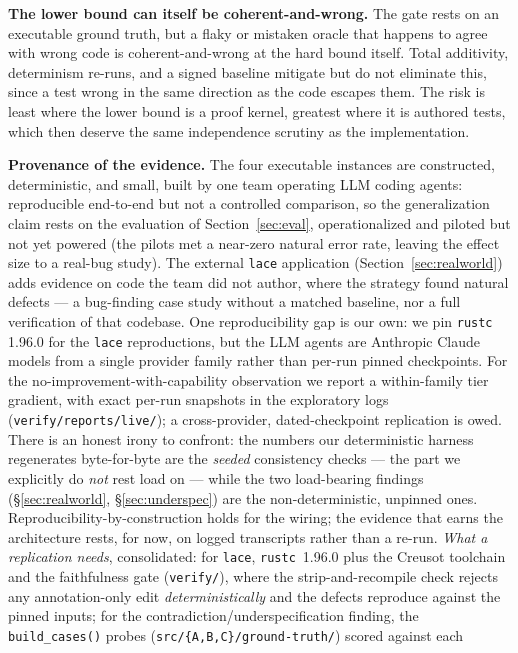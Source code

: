 \documentclass[11pt]{article}
\newcommand{\code}[1]{\texttt{#1}}
\begin{document}
\textbf{The lower bound can itself be coherent-and-wrong.} The gate rests on an executable
ground truth, but a flaky or mistaken oracle that happens to agree with wrong code is
coherent-and-wrong at the hard bound itself. Total additivity, determinism re-runs, and a
signed baseline mitigate but do not eliminate this, since a test wrong in the same
direction as the code escapes them. The risk is least where the lower bound is a proof kernel,
greatest where it is authored tests, which then deserve the same independence scrutiny as
the implementation.

\textbf{Provenance of the evidence.} The four executable instances are constructed,
deterministic, and small, built by one team operating LLM coding agents: reproducible
end-to-end but not a controlled comparison, so the generalization claim rests on the evaluation
of Section~\ref{sec:eval}, operationalized and piloted but not yet powered (the pilots met a
near-zero natural error rate, leaving the effect size to a real-bug study). The external
\code{lace} application (Section~\ref{sec:realworld}) adds evidence on code the team did not
author, where the strategy found \ResRWBugsNum{} natural defects --- a bug-finding case study
without a matched baseline, nor a full verification of that codebase. One reproducibility gap is
our own: we pin \code{rustc} 1.96.0 for the \code{lace} reproductions, but the LLM agents are
Anthropic Claude models from a single provider family rather than per-run pinned checkpoints.
For the no-improvement-with-capability observation we report a within-family tier gradient, with exact per-run
snapshots in the exploratory logs (\code{verify/reports/live/}); a cross-provider,
dated-checkpoint replication is owed. There is an honest irony to confront: the numbers our
deterministic harness regenerates byte-for-byte are the \emph{seeded} consistency checks --- the
part we explicitly do \emph{not} rest load on --- while the two load-bearing findings
(\S\ref{sec:realworld}, \S\ref{sec:underspec}) are the non-deterministic, unpinned ones.
Reproducibility-by-construction holds for the wiring; the evidence that earns the architecture rests,
for now, on logged transcripts rather than a re-run. \emph{What a replication needs}, consolidated: for
\code{lace}, \code{rustc}~1.96.0 plus the Creusot toolchain and the faithfulness gate (\code{verify/}),
where the strip-and-recompile check rejects any annotation-only edit \emph{deterministically} and the
\ResRWBugsNum{} defects reproduce against the pinned inputs; for the contradiction/underspecification
finding, the \code{build\_cases()} probes (\code{src/\{A,B,C\}/ground-truth/}) scored against each
\end{document}
